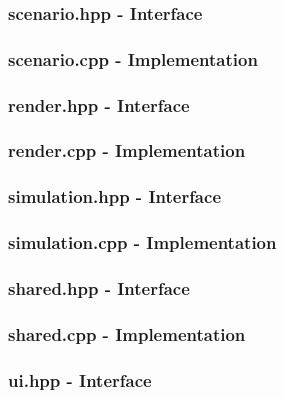 \subsubsection{scenario.hpp - Interface}
\texttt{} 
\pagebreak
\subsubsection{scenario.cpp - Implementation}
\texttt{} 
\subsubsection{render.hpp - Interface}
\texttt{} 
\pagebreak
\subsubsection{render.cpp - Implementation}
\texttt{} 
\pagebreak
\subsubsection{simulation.hpp - Interface}
\texttt{} 
\pagebreak
\subsubsection{simulation.cpp - Implementation}
\texttt{} 
\pagebreak
\subsubsection{shared.hpp - Interface}
\texttt{} 
\pagebreak
\subsubsection{shared.cpp - Implementation}
\texttt{} 
\pagebreak
\subsubsection{ui.hpp - Interface}
\texttt{} 
\pagebreak
